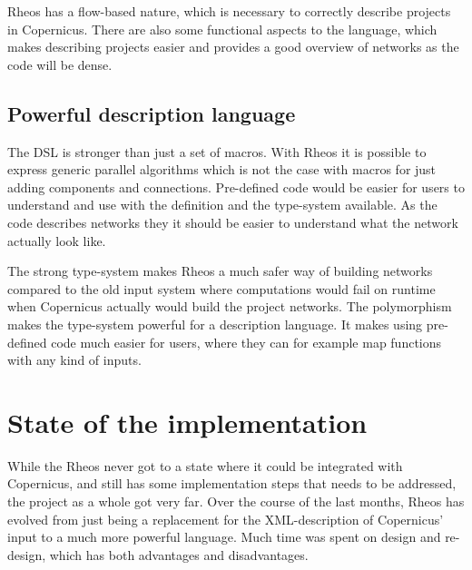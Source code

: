 Rheos has a flow-based nature, which is necessary to correctly
describe projects in Copernicus. There are also some functional
aspects to the language, which makes describing projects easier and
provides a good overview of networks as the code will be dense.


\subsection{Powerful description language}
The DSL is stronger than just a set of macros. With Rheos it is
possible to express generic parallel algorithms which is not the case
with macros for just adding components and connections. Pre-defined
code would be easier for users to understand and use with the
definition and the type-system available. As the code describes
networks they it should be easier to understand what the network
actually look like. 

The strong type-system makes Rheos a much safer way of building
networks compared to the old input system where computations would
fail on runtime when Copernicus actually would build the project
networks. The polymorphism makes the type-system powerful for a
description language. It makes using pre-defined code much easier for
users, where they can for example map functions with any kind of
inputs.

\section{State of the implementation}
While the Rheos never got to a state where it could be integrated with
Copernicus, and still has some implementation steps that needs to be
addressed, the project as a whole got very far. Over the course of the
last months, Rheos has evolved from just being a replacement for the
XML-description of Copernicus' input to a much more powerful
language. Much time was spent on design and re-design, which has both
advantages and disadvantages.
